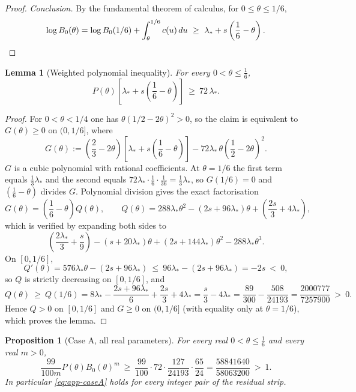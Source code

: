 \documentclass[11pt]{article}
\newtheorem{lemma}[theorem]{Lemma}
\newtheorem{proposition}[theorem]{Proposition}
\theoremstyle{remark}
\theoremstyle{plain}
\theoremstyle{plain}
\begin{document}
\begin{proof}
\emph{Conclusion.}  By the fundamental theorem of calculus, for
$0\le\theta\le1/6$,
\[
        \log B_0(\theta)
        =\log B_0(1/6)+\int_\theta^{1/6}c(u)\,du
        \ \ge\ \lambda_*+s\left(\frac16-\theta\right). \qedhere
\]
\end{proof}

\begin{lemma}[Weighted polynomial inequality]\label{lem:app-cubic}
For every $0<\theta\le\frac16$,
\[
        P(\theta)\left[\lambda_*+s\left(\frac16-\theta\right)\right]
        \ \ge\ 72\,\lambda_* .
\]
\end{lemma}

\begin{proof}
For $0<\theta<1/4$ one has $\theta(1/2-2\theta)^2>0$, so the claim is
equivalent to $G(\theta)\ge0$ on $(0,1/6]$, where
\[
        G(\theta)
        :=\left(\frac23-2\theta\right)
        \left[\lambda_*+s\left(\frac16-\theta\right)\right]
        -72\lambda_*\,\theta\left(\frac12-2\theta\right)^2 .
\]
$G$ is a cubic polynomial with rational coefficients.  At $\theta=1/6$ the
first term equals $\frac13\lambda_*$ and the second equals
$72\lambda_*\cdot\frac16\cdot\frac1{36}=\frac13\lambda_*$, so $G(1/6)=0$ and
$\left(\frac16-\theta\right)$ divides $G$.  Polynomial division gives the
exact factorisation
\begin{equation}\label{eq:app-G-factor}
        G(\theta)=\left(\frac16-\theta\right)Q(\theta),
        \qquad
        Q(\theta)
        =288\lambda_*\theta^2-(2s+96\lambda_*)\theta
        +\left(\frac{2s}3+4\lambda_*\right),
\end{equation}
which is verified by expanding both sides to
\[
        \left(\frac{2\lambda_*}3+\frac s9\right)
        -\left(s+20\lambda_*\right)\theta
        +\left(2s+144\lambda_*\right)\theta^2
        -288\lambda_*\theta^3 .
\]
On $[0,1/6]$,
\[
        Q'(\theta)=576\lambda_*\theta-(2s+96\lambda_*)
        \ \le\ 96\lambda_*-(2s+96\lambda_*)=-2s\ <\ 0,
\]
so $Q$ is strictly decreasing on $[0,1/6]$, and
\begin{equation}\label{eq:app-Q-endpoint}
        Q(\theta)\ \ge\ Q(1/6)
        =8\lambda_*-\frac{2s+96\lambda_*}{6}+\frac{2s}3+4\lambda_*
        =\frac s3-4\lambda_*
        =\frac{89}{300}-\frac{508}{24193}
        =\frac{2000777}{7257900}\ >\ 0 .
\end{equation}
Hence $Q>0$ on $[0,1/6]$ and $G\ge0$ on $(0,1/6]$ (with equality only at
$\theta=1/6$), which proves the lemma.
\end{proof}

\begin{proposition}[Case A, all real parameters]\label{prop:app-caseA-full}
For every real $0<\theta\le\frac16$ and every real $m>0$,
\[
        \frac{99}{100m}P(\theta)B_0(\theta)^m\ \ge\
        \frac{99}{100}\cdot72\cdot\frac{127}{24193}\cdot\frac{65}{24}
        =\frac{58841640}{58063200}\ >\ 1 .
\]
In particular \eqref{eq:app-caseA} holds for every integer pair of the
residual strip.
\end{proposition}
\end{document}
